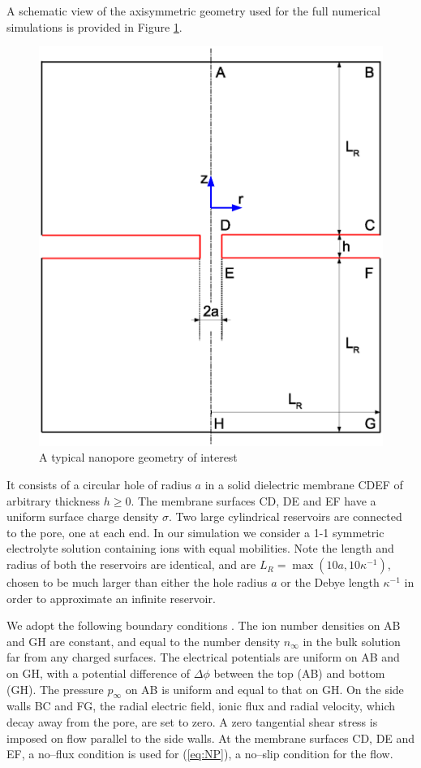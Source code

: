 A schematic view of the axisymmetric geometry used for the full numerical simulations is provided in Figure \ref{fig:system_num}. 
\begin{figure}[h]
\centering
\includegraphics[width=1.0\textwidth]{openfoam/figure4.eps}
\caption{A typical nanopore geometry of interest}
\label{fig:system_num}
\end{figure}
It consists of a circular hole of radius $a$ in a solid dielectric membrane CDEF of arbitrary thickness $h\ge 0$. The membrane surfaces CD, DE and EF have a uniform surface charge density $\sigma$. Two large cylindrical reservoirs are connected to the pore, one at each end. In our simulation we consider a 1-1 symmetric electrolyte solution containing ions with equal mobilities. Note the length and radius of both the reservoirs are identical, and are $L_R=\max(10a, 10\kappa^{-1})$, chosen to be much larger than either the hole radius $a$ or the Debye length $\kappa^{-1}$  in order to approximate an infinite reservoir. 

We adopt the following boundary conditions \cite{Mao2013}. The ion number densities on AB and GH are constant, and equal to the number density $n_\infty$ in the bulk solution far from any charged surfaces. The electrical potentials are uniform on AB and on GH, with a potential difference of $\Delta\phi$ between the top (AB) and bottom (GH). The pressure $p_{\infty}$ on AB is uniform and equal to that on GH. On the side walls BC and FG, the radial electric field, ionic flux and radial velocity, which decay away from the pore, are set to zero. A zero tangential shear stress is imposed on flow parallel to the side walls. At the membrane surfaces CD, DE and EF, a no--flux condition is used for (\ref{eq:NP}), a no--slip condition for the flow. 

